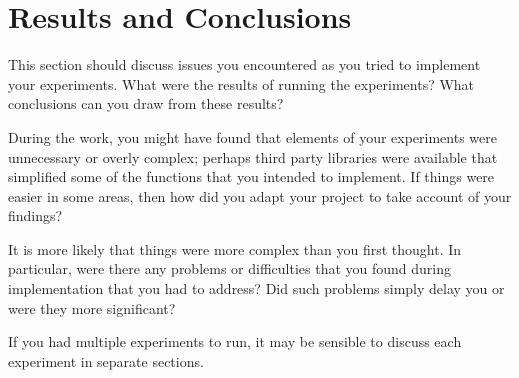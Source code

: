 \chapter{Results and Conclusions}

This section should discuss issues you encountered as you tried to implement your experiments. What were the results of running the experiments? What conclusions can you draw from these results? 

During the work, you might have found that elements of your experiments were unnecessary or overly complex; perhaps third party libraries were available that simplified some of the functions that you intended to implement. If things were easier in some areas, then how did you adapt your project to take account of your findings?

It is more likely that things were more complex than you first thought. In particular, were there any problems or difficulties that you found during implementation that you had to address? Did such problems simply delay you or were they more significant? 

If you had multiple experiments to run, it may be sensible to discuss each experiment in separate sections. 
